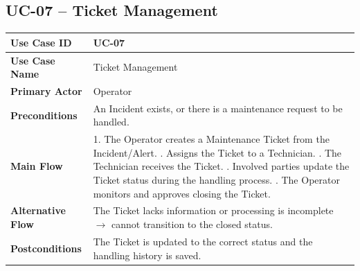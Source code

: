 \vspace{1.5em}

\subsection*{UC-07 -- Ticket Management}
\noindent
\begin{tabularx}{\textwidth}{|>{\bfseries}p{3.2cm}|X|}
\hline
Use Case ID & UC-07 \\ \hline
Use Case Name & Ticket Management \\ \hline
Primary Actor & Operator \\ \hline
Preconditions & An Incident exists, or there is a maintenance request to be handled. \\ \hline
Main Flow & 1. The Operator creates a Maintenance Ticket from the Incident/Alert. \newline
2. Assigns the Ticket to a Technician. \newline
3. The Technician receives the Ticket. \newline
4. Involved parties update the Ticket status during the handling process. \newline
5. The Operator monitors and approves closing the Ticket. \\ \hline
Alternative Flow & The Ticket lacks information or processing is incomplete $\rightarrow$ cannot transition to the closed status. \\ \hline
Postconditions & The Ticket is updated to the correct status and the handling history is saved. \\ \hline
\end{tabularx}

\vspace{1.5em}

